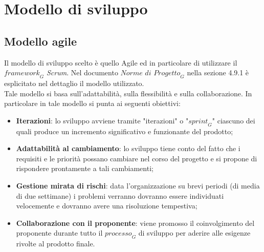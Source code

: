 \section{Modello di sviluppo}
\subsection{Modello agile}
Il modello di sviluppo scelto è quello Agile ed in particolare di utilizzare il $\textit{framework}_G$ \emph{Scrum}. Nel documento $\textit{Norme di Progetto}_G$ nella sezione 4.9.1 è esplicitato nel dettaglio il modello utilizzato.\\ 
Tale modello si basa sull'adattabilità, sulla flessibilità e sulla collaborazione.
In particolare in tale modello si punta ai seguenti obiettivi:
\begin{itemize}
    \item \textbf{Iterazioni}: lo sviluppo avviene tramite "iterazioni" o "$\textit{sprint}_G$" ciascuno dei quali produce un incremento significativo e funzionante del prodotto;
    \item \textbf{Adattabilità al cambiamento}: lo sviluppo tiene conto del fatto che i requisiti e le priorità possano cambiare nel corso del progetto e si propone di rispondere prontamente a tali cambiamenti;
    \item \textbf{Gestione mirata di rischi}: data l'organizzazione su brevi periodi (di media di due settimane) i problemi verranno dovranno essere individuati velocemente e dovranno avere una risoluzione tempestiva;
    \item \textbf{Collaborazione con il proponente}: viene promosso il coinvolgimento del proponente durante tutto il $\textit{processo}_G$ di sviluppo per aderire alle esigenze rivolte al prodotto finale.
\end{itemize}